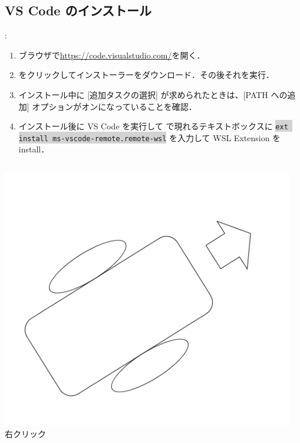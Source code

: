 \documentclass[aspectratio=169,dvipdfmx,cjk]{beamer}
\newcommand{\cmdline}[1]{
    \colorbox{lightgray}{\lstinline[style=command]{#1}}
}
\begin{document}
\subsection{VS Code のインストール}
\begin{frame}{\insertsection \thesubsection: \insertsubsection}
  \begin{enumerate}
    \item ブラウザで\href{https://code.visualstudio.com/}{https://code.visualstudio.com/}を開く．
    \item {} をクリックしてインストーラーをダウンロード．その後それを実行．
    \item インストール中に [追加タスクの選択] が求められたときは、[PATH への追加] オプションがオンになっていることを確認．
    \item インストール後に VS Code を実行して  で現れるテキストボックスに \cmdline{ext install ms-vscode-remote.remote-wsl} を入力して WSL Extension を install．
  \end{enumerate}
  \begin{columns}
    \begin{column}{0.33\textwidth}
        \includegraphics[width=1.0\linewidth]{fig/robot.png}
        右クリック
    \end{column}
    \begin{column}{0.33\textwidth}

\end{column}
\end{columns}
\end{frame}
\end{document}
